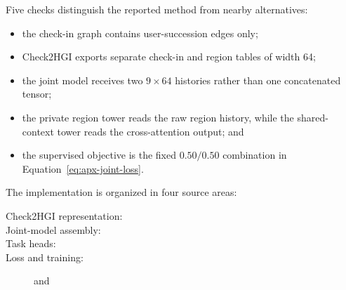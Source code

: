 Five checks distinguish the reported method from nearby alternatives:
\begin{itemize}
    \item the check-in graph contains user-succession edges only;
    \item Check2HGI exports separate check-in and region tables of width 64;
    \item the joint model receives two $9\times64$ histories rather than one
    concatenated tensor;
    \item the private region tower reads the raw region history, while the
    shared-context tower reads the cross-attention output; and
    \item the supervised objective is the fixed $0.50/0.50$ combination in
    Equation~\ref{eq:apx-joint-loss}.
\end{itemize}

The implementation is organized in four source areas:
{\small
\begin{description}
    \item[Check2HGI representation:] 
    \item[Joint-model assembly:] 
    \item[Task heads:] 
    \item[Loss and training:]  and 
\end{description}
}
